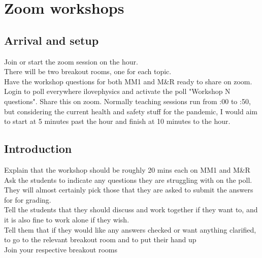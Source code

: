\documentclass[11.5pt,sans,english]{article}
\begin{document}
\section{Zoom workshops}


\subsection{Arrival and setup}
Join or start the zoom session on the hour.\\
There will be two breakout rooms, one for each topic.\\
Have the workshop questions for both MM1 and M\&R ready to share on zoom.\\
Login to poll everywhere ilovephysics and activate the poll "Workshop N questions". Share this on zoom.
Normally teaching sessions run from :00 to :50, but considering the current health and safety stuff for the pandemic, I would aim to start at 5 minutes past the hour and finish at 10 minutes to the hour.\\

\subsection{Introduction}
Explain that the workshop should be roughly 20 mins each on MM1 and M\&R\\
Ask the students to indicate any questions they are struggling with on the poll. They will almost certainly pick those that they are asked to submit the answers for for grading.\\
Tell the students that they should discuss and work together if they want to, and it is also fine to work alone if they wish.\\
Tell them that if they would like any answers checked or want anything clarified, to go to the relevant breakout room and to put their hand up\\
Join your respective breakout rooms\\
\end{document}
